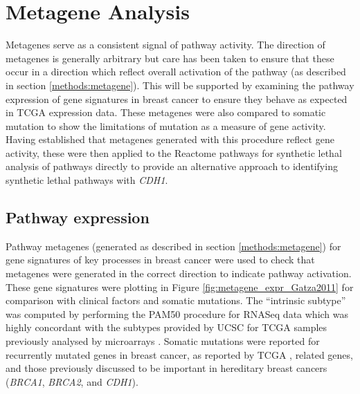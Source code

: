 \fi


\section{Metagene Analysis}

Metagenes serve as a consistent signal of pathway activity. The direction of metagenes is generally arbitrary but care has been taken to ensure that these occur in a direction which reflect overall activation of the pathway (as described in section \ref{methods:metagene}). This will be supported by examining the pathway expression of gene signatures in breast cancer to ensure they behave as expected in TCGA expression data. These metagenes were also compared to somatic mutation to show the limitations of mutation as a measure of gene activity. Having established that metagenes generated with this procedure reflect gene activity, these were then applied to the Reactome pathways for synthetic lethal analysis of pathways directly to provide an alternative approach to identifying synthetic lethal pathways with \textit{CDH1}.

\subsection{Pathway expression} \label{chapt3:metagene_expression}

Pathway metagenes (generated as described in section \ref{methods:metagene}) for gene signatures of key processes in breast cancer \citep{Gatza2011} were used to check that metagenes were generated in the correct direction to indicate pathway activation. These gene signatures were plotting in Figure \ref{fig:metagene_expr_Gatza2011} for comparison with clinical factors and somatic mutations. The ``intrinsic subtype''  was computed by performing the PAM50 procedure \cite{Parker2009} for RNASeq data which was highly concordant with the subtypes provided by UCSC for TCGA samples previously analysed by microarrays \citep{TCGA2012}. Somatic mutations were reported for recurrently mutated genes in breast cancer, as reported by TCGA \citep{TCGA2012}, related genes, and those previously discussed to be important in hereditary breast cancers (\textit{BRCA1}, \textit{BRCA2}, and \textit{CDH1}).

